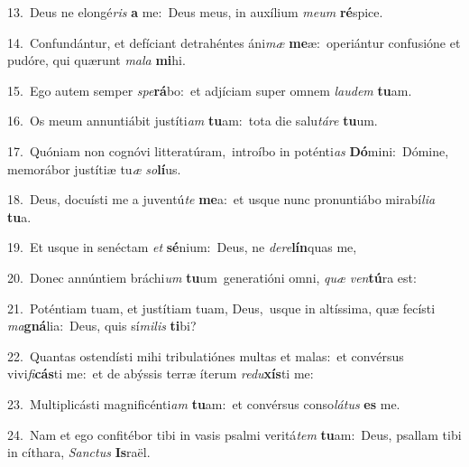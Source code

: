 {\numbfont\textcolor{\numbcolor}{13.}}~Deus ne elongé\textit{ris} \textbf{a} me:~\star Deus meus, in auxílium \textit{me}\-\textit{um} \textbf{ré}\-spice.\par
{\numbfont\textcolor{\numbcolor}{14.}}~Confundántur, et defíciant detrahéntes áni\textit{mæ} \textbf{me}\-æ:~\star operiántur confusióne et pudóre, qui quærunt \textit{ma}\-\textit{la} \textbf{mi}\-hi.\par
{\numbfont\textcolor{\numbcolor}{15.}}~Ego autem semper \textit{spe}\-\textbf{rá}bo:~\star et adjíciam super omnem \textit{lau}\-\textit{dem} \textbf{tu}\-am.\par
{\numbfont\textcolor{\numbcolor}{16.}}~Os meum annuntiábit justíti\textit{am} \textbf{tu}\-am:~\star tota die salu\-\textit{tá}\-\textit{re} \textbf{tu}\-um.\par
{\numbfont\textcolor{\numbcolor}{17.}}~Quóniam non cognóvi litteratúram,~\dagger introíbo in poténti\textit{as} \textbf{Dó}\-mini:~\star Dómine, memorábor justítiæ tu\textit{æ} \textit{so}\-\textbf{lí}us.\par
{\numbfont\textcolor{\numbcolor}{18.}}~Deus, docuísti me a juventú\textit{te} \textbf{me}\-a:~\star et usque nunc pronuntiábo mirabí\-\textit{li}\-\textit{a} \textbf{tu}\-a.\par
{\numbfont\textcolor{\numbcolor}{19.}}~Et usque in senéctam \textit{et} \textbf{sé}\-nium:~\star Deus, ne \textit{de}\-\textit{re}\textbf{lín}quas me,\par
{\numbfont\textcolor{\numbcolor}{20.}}~Donec annúntiem bráchi\textit{um} \textbf{tu}\-um~\star generatióni omni, \textit{quæ} \textit{ven}\-\textbf{tú}ra est:\par
{\numbfont\textcolor{\numbcolor}{21.}}~Poténtiam tuam, et justítiam tuam, Deus,~\dagger usque in altíssima, quæ fecísti \textit{ma}\-\textbf{gná}lia:~\star Deus, quis sí\-\textit{mi}\-\textit{lis} \textbf{ti}\-bi?\par
{\numbfont\textcolor{\numbcolor}{22.}}~Quantas ostendísti mihi tribulatiónes multas et malas:~\dagger et convérsus vivi\-\textit{fi}\-\textbf{cás}ti me:~\star et de abýssis terræ íterum \textit{re}\-\textit{du}\textbf{xís}ti me:\par
{\numbfont\textcolor{\numbcolor}{23.}}~Multiplicásti magnificénti\textit{am} \textbf{tu}\-am:~\star et convérsus conso\-\textit{lá}\-\textit{tus} \textbf{es} me.\par
{\numbfont\textcolor{\numbcolor}{24.}}~Nam et ego confitébor tibi in vasis psalmi veritá\textit{tem} \textbf{tu}\-am:~\star Deus, psallam tibi in cíthara, \textit{Sanc}\-\textit{tus} \textbf{Is}\-raël.\par
